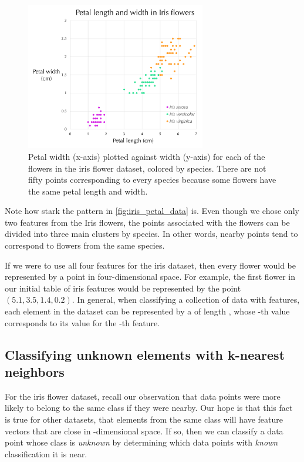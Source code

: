 \begin{figure}[h]
\centering
\mySfFamily
\includegraphics[width = 0.7\textwidth]{../images/iris_petal_data.png}
\caption{Petal width (x-axis) plotted against width (y-axis) for each of the flowers in the iris flower dataset, colored by species. There are not fifty points corresponding to every species because some flowers have the same petal length and width.}
\label{fig:iris_petal_data}
\end{figure}

Note how stark the pattern in \autoref{fig:iris_petal_data} is. Even though we chose only two features from the Iris flowers, the points associated with the flowers can be divided into three main clusters by species. In other words, nearby points tend to correspond to flowers from the same species.

If we were to use all four features for the iris dataset, then every flower would be represented by a point in four-dimensional space. For example, the first flower in our initial table of iris features would be represented by the point $(5.1, 3.5, 1.4, 0.2)$. In general, when classifying a collection of data with  features, each element in the dataset can be represented by a  of length , whose -th value corresponds to its value for the -th feature.

\FloatBarrier
{}
\subsection{Classifying unknown elements with k-nearest neighbors}

For the iris flower dataset, recall our observation that data points were more likely to belong to the same class if they were nearby. Our hope is that this fact is true for other datasets, that elements from the same class will have feature vectors that are close in -dimensional space. If so, then we can classify a data point whose class is \textit{unknown} by determining which data points with \textit{known} classification it is near.\\

